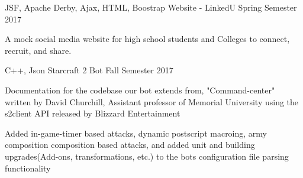 


\begin{cventries}


\cventry
{JSF, Apache Derby, Ajax, HTML, Boostrap} %
{Website - LinkedU} %
{} %
{Spring Semester 2017} %
{ %
\begin{cvitems}
\item {A mock social media website for high school students and Colleges to connect, recruit, and share.}
\end{cvitems}
}


\cventry
{ C++, Json} %
{Starcraft 2 Bot} %
{} %
{Fall Semester 2017} %
{ %
\begin{cvitems}
\item { Documentation for the codebase our bot extends from, "Command-center" written by David Churchill, Assistant professor of Memorial University using the s2client API released by Blizzard Entertainment}
\item {Added in-game-timer based attacks, dynamic postscript macroing, army composition composition based attacks, and added unit and building upgrades(Add-ons, transformations, etc.) to the bots configuration file parsing functionality}
\end{cvitems}
}



\end{cventries}